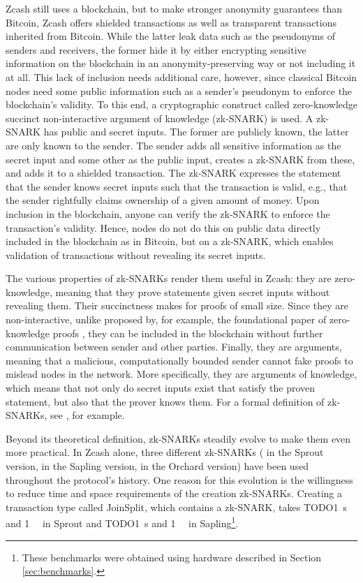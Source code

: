 \documentclass{article}
\begin{document}
Zcash still uses a blockchain, but to make stronger anonymity guarantees than Bitcoin, Zcash offers shielded transactions as well as transparent transactions inherited from Bitcoin.
While the latter leak data such as the pseudonyms of senders and receivers, the former hide it by either encrypting sensitive information on the blockchain in an anonymity-preserving way or not including it at all.
This lack of inclusion needs additional care, however, since classical Bitcoin nodes need some public information such as a sender's pseudonym to enforce the blockchain's validity.
To this end, a cryptographic construct called zero-knowledge succinct non-interactive argument of knowledge (zk-SNARK) is used.
A zk-SNARK has public and secret inputs.
The former are publicly known, the latter are only known to the sender.
The sender adds all sensitive information as the secret input and some other as the public input, creates a zk-SNARK from these, and adds it to a shielded transaction.
The zk-SNARK expresses the statement that the sender knows secret inputs such that the transaction is valid, e.g., that the sender rightfully claims ownership of a given amount of money.
Upon inclusion in the blockchain, anyone can verify the zk-SNARK to enforce the transaction's validity.
Hence, nodes do not do this on public data directly included in the blockchain as in Bitcoin, but on a zk-SNARK, which enables validation of transactions without revealing its secret inputs.

The various properties of zk-SNARKs render them useful in Zcash: they are zero-knowledge, meaning that they prove statements given secret inputs without revealing them.
Their succinctness makes for proofs of small size.
Since they are non-interactive, unlike proposed by, for example, the foundational paper of zero-knowledge proofs \cite{goldwasser:zk}, they can be included in the blockchain without further communication between sender and other parties.
Finally, they are arguments, meaning that a malicious, computationally bounded sender cannot fake proofs to mislead nodes in the network.
More specifically, they are arguments of knowledge, which means that not only do secret inputs exist that satisfy the proven statement, but also that the prover knows them.
For a formal definition of zk-SNARKs, see \cite{groth:zksnark}, for example.

Beyond its theoretical definition, zk-SNARKs steadily evolve to make them even more practical.
In Zcash alone, three different zk-SNARKs (\cite{bensasson:zksnark} in the Sprout version, \cite{groth:zksnark} in the Sapling version, \cite{zcash:halo2} in the Orchard version) have been used throughout the protocol's history.
One reason for this evolution is the willingness to reduce time and space requirements of the creation zk-SNARKs.
Creating a transaction type called JoinSplit, which contains a zk-SNARK, takes TODO\SI{1}{\second} and \SI{1}{\gibi\byte} in Sprout and TODO\SI{1}{\second} and \SI{1}{\gibi\byte} in Sapling\footnote{These benchmarks were obtained using hardware described in Section \ref{sec:benchmarks}.}.
\end{document}
